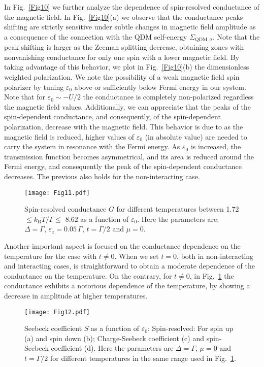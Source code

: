 \documentclass[aps,twocolumn,prb,superscript,floatfix,superscriptaddress,showpacs]{revtex4-1}
\newcommand{\ve}{\varepsilon}
\begin{document}
In Fig.\ \ref{Fig10} we further analyze the dependence of spin-resolved conductance of the magnetic field. In Fig.\ \ref{Fig10}(a) we observe that the conductance peaks shifting are strictly sensitive under subtle changes in magnetic field amplitude as a consequence of the connection with the QDM self-energy $\Sigma_{\text{QDM},\sigma}$. Note that the peak shifting is larger as the Zeeman splitting decrease, obtaining zones with nonvanishing conductance for only one spin with a lower magnetic field. By taking advantage of this behavior, we plot in Fig.\ \ref{Fig10}(b) the dimensionless weighted polarization. We note the possibility of a weak magnetic field spin polarizer by tuning $\ve_0$ above or sufficiently below Fermi energy in our system. Note that for $\ve_{0}\sim-U/2$ the conductance is completely non-polarized regardless the magnetic field values. Additionally, we can appreciate that the peaks of the spin-dependent conductance, and consequently, of the spin-dependent polarization, decrease with the magnetic field. This behavior is due to as the magnetic field is reduced, higher values of $\ve_0$ (in absolute value) are needed to carry the system in resonance with the Fermi energy. As $\varepsilon_0$ is increased, the transmission function becomes asymmetrical, and its area is reduced around the Fermi energy, and consequently the peak of the spin-dependent conductance decreases. The previous also holds for the non-interacting case.

\begin{figure}[tbph]
\centering
\texttt{[image: Fig11.pdf]}
\caption{Spin-resolved conductance $G$ for different temperatures between 1.72 $\leq k_{\text{B}}T/\Gamma\leq$ 8.62 as a function of $\ve_{0}$. Here the parameters are: $\Delta=\Gamma$, $\ve_{z}=0.05\,\Gamma$, $t=\Gamma/2$ and $\mu=0$.}
\label{Fig11}
\end{figure}

Another important aspect is focused on the conductance dependence on the temperature for the case with $t\neq0$. When we set $t=0$, both in non-interacting and interacting cases, is straightforward to obtain a moderate dependence  of the conductance on the temperature. On the contrary, for $t\neq0$, in Fig.\ \ref{Fig11} the conductance exhibits a notorious dependence of the temperature, by showing a decrease in amplitude at higher temperatures.

\begin{figure}[tbph]
\centering
\texttt{[image: Fig12.pdf]}
\caption{Seebeck coefficient $S$ as a function of $\ve_{0}$: Spin-resolved: For spin up (a) and spin down (b); Charge-Seebeck coefficient (c) and spin-Seebeck coefficient (d). Here the parameters are $\Delta=\Gamma$, $\mu=0$ and $t=\Gamma/2$ for different temperatures in the same range used in Fig.\ \ref{Fig11}.}
\label{Fig12}
\end{figure}
\end{document}
